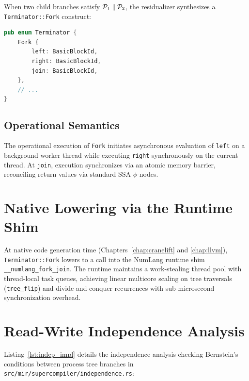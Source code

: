 When two child branches satisfy $\mathcal{P}_1 \parallel \mathcal{P}_2$, the residualizer synthesizes a \texttt{Terminator::Fork} construct:

\begin{lstlisting}[language=Rust, caption={The Fork/Join Terminator in NumLang SSA MIR.}]
pub enum Terminator {
    Fork {
        left: BasicBlockId,
        right: BasicBlockId,
        join: BasicBlockId,
    },
    // ...
}
\end{lstlisting}

\subsection{Operational Semantics}
The operational execution of \texttt{Fork} initiates asynchronous evaluation of \texttt{left} on a background worker thread while executing \texttt{right} synchronously on the current thread. At \texttt{join}, execution synchronizes via an atomic memory barrier, reconciling return values via standard SSA $\phi$-nodes.

\section{Native Lowering via the Runtime Shim}
\label{sec:parallel:runtime}

At native code generation time (Chapters~\ref{chap:cranelift} and \ref{chap:llvm}), \texttt{Terminator::Fork} lowers to a call into the NumLang runtime shim \texttt{\_\_numlang\_fork\_join}. The runtime maintains a work-stealing thread pool with thread-local task queues, achieving linear multicore scaling on tree traversals (\texttt{tree\_flip}) and divide-and-conquer recurrences with sub-microsecond synchronization overhead.

\section{Read-Write Independence Analysis}
\label{sec:parallel:indep_impl}

Listing~\ref{lst:indep_impl} details the independence analysis checking Bernstein's conditions between process tree branches in \texttt{src/mir/supercompiler/independence.rs}:

